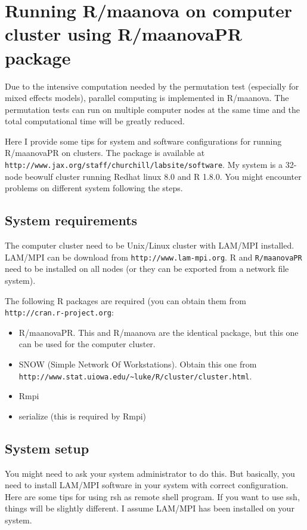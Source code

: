 \section{Running R/maanova on computer cluster using R/maanovaPR package}


Due to the intensive computation needed by the permutation test
(especially for mixed effects models), parallel computing is
implemented in R/maanova. The permutation tests can run on
multiple computer nodes at the same time and the total
computational time will be greatly reduced.  

Here I provide some tips for system and software configurations for
running R/maanovaPR on clusters. The package is available at {\tt
http://www.jax.org/staff/churchill/labsite/software}. My system is a 32-node beowulf
cluster running Redhat linux 8.0 and R 1.8.0. 
You might encounter problems on different system
following the steps. 

\subsection{System requirements}
The computer cluster need to be Unix/Linux cluster with LAM/MPI
installed. LAM/MPI can be download from {\tt http://www.lam-mpi.org}. 
R and {\tt R/maanovaPR} need to be installed on all nodes (or they
can be exported from a network file system). 

The following R packages are required (you can obtain them
from {\tt http://cran.r-project.org}:
\begin{itemize}
\item R/maanovaPR. This and R/maanova are the identical package, but this
  one can be used for the computer cluster.   
\item SNOW (Simple Network Of Workstations). Obtain this one from\\
{\tt http://www.stat.uiowa.edu/\~{}luke/R/cluster/cluster.html}.
\item Rmpi
\item serialize (this is required by Rmpi)
\end{itemize}

\subsection{System setup}
You might need to ask your system administrator to do this. 
But basically,
you need to install LAM/MPI software in your system with correct
configuration. Here are some tips for using rsh as remote shell program.
If you want to use ssh, things will be slightly different. I assume
LAM/MPI has been installed on your system.

